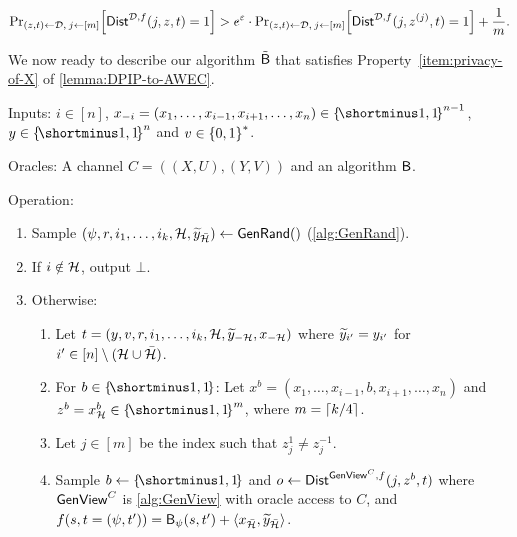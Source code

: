 \begin{align}\label{eq:Dist-gap}
	\ppr{(z,t) \la \cD, \: j \la [m]}{\Dist^{\cD,f}(j, z, t) = 1} > e^{\eps}\cdot \ppr{(z,t) \la \cD, \: j \la [m]}{\Dist^{\cD,f}(j ,z^{(j)}, t) = 1} + \frac1m.
\end{align}


We now ready to describe our algorithm ${\tilde{\mathsf{B}}}$ that satisfies Property~\ref{item:privacy-of-X} of \cref{lemma:DPIP-to-AWEC}.


\begin{algorithm}\label{alg:Bct}
	\item Inputs: $i \in [n]$, $x_{-i} = (x_1,\ldots,x_{i-1},x_{i+1},\ldots,x_n) \in \oo^{n-1}$, $y \in \oo^n$ and $v \in \zo^*$.
	\item Oracles: A channel $C = ((X,U),(Y,V))$ and an algorithm $\mathsf{B}$.
	\item Operation:~
	\begin{enumerate}
		\item Sample $(\psi, r,i_1,\ldots,i_k,{\cal H},\widetilde{y}_{\bar{{\cal H}}}) \gets \mathsf{GenRand}()$ (\cref{alg:GenRand}).
		\item If $i \notin {\cal H}$, output $\bot$.
		\item Otherwise:
		\begin{enumerate}
			\item Let $t = (y,v,r,i_1,\ldots,i_k,{\cal H},\widetilde{y}_{-{\cal H}},x_{-{\cal H}})$ where $\widetilde{y}_{i'} = y_{i'}$ for $i' \in [n]\setminus ({\cal H} \cup \bar{{\cal H}})$.
			\item For $b \in \oo$: Let $x^b = (x_1,\ldots,x_{i-1},b, x_{i+1},\ldots,x_n)$ and $z^b = x^b_{\cH} \in \oo^m$, where $m = \ceil{k/4}$.
			\item Let $j \in [m]$ be the index such that $z^1_j \neq z^{-1}_j$.
			\item Sample $b \la \oo$ and $o \gets \mathsf{Dist}^{\mathsf{GenView}^C, f}(j,z^b,t)$ where $\mathsf{GenView}^C$ is \cref{alg:GenView} with oracle access to $C$, and $f(s,t = (\psi,t')) = \mathsf{B}_{\psi}(s,t') + \langle x_{\bar{{\cal H}}}, \widetilde{y}_{\bar{{\cal H}}} \rangle$. 
			\color{black}{\item If $o = 1$, output $b$. Otherwise, output $\bot$.}
		\end{enumerate}
	\end{enumerate}
\end{algorithm}

